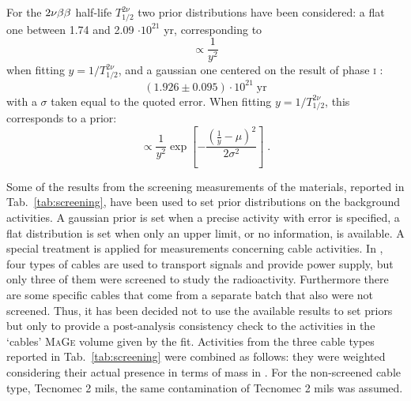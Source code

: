  For the $2\nu\beta\beta$ half-life $T_{1/2}^{2\nu}$ two prior distributions have been considered: a flat one between 1.74 and 2.09 $\cdot10^{21}$ yr, corresponding to
\[\propto\frac{1}{y^2}\]
when fitting $y=1/T_{1/2}^{2\nu}$, and a gaussian one centered on the result of {\gerda} phase \textsc{i} \cite{gerda2nbb}:
\[(1.926\pm0.095)\cdot10^{21}\;\text{yr}\]
with a $\sigma$ taken equal to the quoted error. When fitting $y=1/T_{1/2}^{2\nu}$, this corresponds to a prior:
\[\propto \frac{1}{y^2}\exp\left[-\frac{\left(\frac{1}{y}-\mu\right)^2}{2\sigma^2}\right]\;.\]

Some of the results from the screening measurements of the materials, reported in Tab.~\ref{tab:screening}, have been used to set prior distributions on the background activities. A gaussian prior is set when a precise activity with error is specified, a flat distribution is set when only an upper limit, or no information, is available. A special treatment is applied for measurements concerning cable activities. In {\gerda}, four types of cables are used to transport signals and provide power supply, but only three of them were screened to study the radioactivity. Furthermore there are some specific cables that come from a separate batch that also were not screened. Thus, it has been decided not to use the available results to set priors but only to provide a post-analysis consistency check to the activities in the `cables' \textsc{MaGe} volume given by the fit. Activities from the three cable types reported in Tab.~\ref{tab:screening} were combined as follows: they were weighted considering their actual presence in terms of mass in {\gerda}. For the non-screened cable type, Tecnomec 2 mils, the same contamination of Tecnomec 2 mils was assumed.

